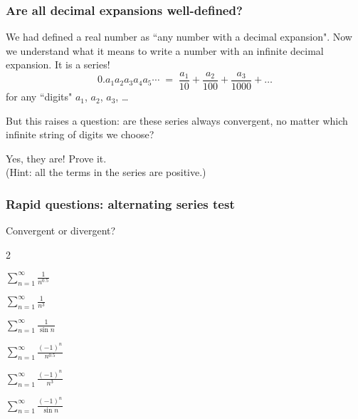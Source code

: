 \documentclass[14pt]{beamer}
\begin{document}
	\begin{frame}[t]
		\fontsize{13}{13}\selectfont
		\frametitle{Are all decimal expansions well-defined?}

		We had defined a real number as ``any number with a decimal expansion". Now we
		understand what it means to write a number with an infinite decimal expansion.
		It is a series!
		\[
			0.a_{1}a_{2}a_{3}a_{4}a_{5}\cdots \; = \; \frac{a_{1}}{10}+ \frac{a_{2}}{100}
			+ \frac{a_{3}}{1000}+ \ldots
		\]
		for any ``digits" $a_{1}$, $a_{2}$, $a_{3}$, \ldots

		But this raises a question: are these series always convergent, no matter
		which infinite string of digits we choose?

		Yes, they are! Prove it. \\ (Hint: all the terms in the series are positive.)
	\end{frame}





	\begin{frame}[t]
		\frametitle{Rapid questions: alternating series test}

		Convergent or divergent?

		\begin{enumerate}
		\end{enumerate}
	\end{frame}
\end{document}
